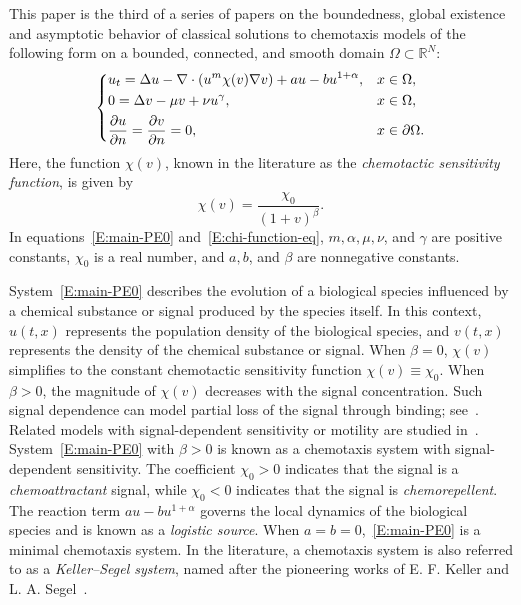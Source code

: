 \documentclass[11pt]{article} %
\theoremstyle{remark}
\theoremstyle{remark}
\numberwithin{equation}{section}
\numberwithin{figure}{section}
\numberwithin{table}{section}
\begin{document}
This paper is the third of a series of papers on the boundedness, global
existence and asymptotic behavior of classical solutions to chemotaxis models of
the following form on a bounded, connected, and smooth domain $\Omega \subset
\mathbb{R}^N$:
\begin{align}\label{E:main-PE0}
  \begin{dcases}
    u_t = \Delta u -  \nabla \cdot (u^m\chi(v)  \nabla v) + au - b u^{1+\alpha}, & x \in \Omega, \\
    0= \Delta v - \mu v + \nu u^\gamma,                                          & x \in \Omega, \\
    \frac{\partial u}{\partial n} = \frac{\partial v}{\partial n} = 0,           & x \in \partial\Omega.
  \end{dcases}
\end{align}
Here, the function $\chi(v)$, known in the literature as the \textit{chemotactic
sensitivity function}, is given by
\begin{equation}\label{E:chi-function-eq}
  \chi(v) = \frac{\chi_0}{(1+ v)^\beta}.
\end{equation}
In equations~\eqref{E:main-PE0} and~\eqref{E:chi-function-eq}, $m, \alpha, \mu,
\nu$, and $\gamma$ are positive constants, $\chi_0$ is a real number, and $a, b$,
and $\beta$ are nonnegative constants.


System~\eqref{E:main-PE0} describes the evolution of a biological species
influenced by a chemical substance or signal produced by the species itself. In
this context, $u(t, x)$ represents the population density of the biological
species, and $v(t, x)$ represents the density of the chemical substance or
signal. When $\beta = 0$, $\chi(v)$ simplifies to the constant chemotactic
sensitivity function $\chi(v) \equiv \chi_0$. When $\beta > 0$, the magnitude of
$\chi(v)$ decreases with the signal concentration. Such signal dependence can
model partial loss of the signal through binding; see~\cite{winkler:10:absence}.
Related models with signal-dependent sensitivity or motility are studied
in~\cite{viglialoro.woolley:18:boundedness, baghaei:24:global,
black.lankeit.ea:20:stabilization}. System~\eqref{E:main-PE0} with $\beta > 0$
is known as a chemotaxis system with signal-dependent sensitivity. The
coefficient $\chi_0 > 0$ indicates that the signal is a \textit{chemoattractant}
signal, while $\chi_0 < 0$ indicates that the signal is \textit{chemorepellent}.
The reaction term $a u - b u^{1+\alpha}$ governs the local dynamics of the
biological species and is known as a
\textit{logistic source}. When $a = b = 0$,~\eqref{E:main-PE0} is a minimal
chemotaxis system. In the literature, a chemotaxis system is also referred to as
a \textit{Keller--Segel system}, named after the pioneering works of E. F.
Keller and L. A. Segel~\cite{keller.segel:70:initiation, keller.segel:71:model,
keller.segel:71:traveling}.
\end{document}
